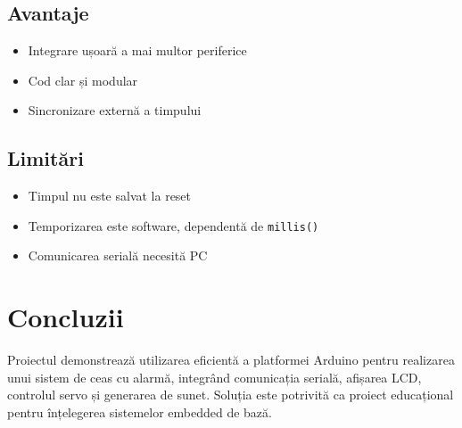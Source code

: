 \documentclass[12pt,a4paper]{article}
\begin{document}
\subsection*{Avantaje}
\begin{itemize}
    \item Integrare ușoară a mai multor periferice
    \item Cod clar și modular
    \item Sincronizare externă a timpului
\end{itemize}

\subsection*{Limitări}
\begin{itemize}
    \item Timpul nu este salvat la reset
    \item Temporizarea este software, dependentă de \texttt{millis()}
    \item Comunicarea serială necesită PC
\end{itemize}

\section{Concluzii}
Proiectul demonstrează utilizarea eficientă a platformei Arduino pentru realizarea unui sistem de ceas cu alarmă, integrând comunicația serială, afișarea LCD, controlul servo și generarea de sunet. Soluția este potrivită ca proiect educațional pentru înțelegerea sistemelor embedded de bază.
\end{document}
